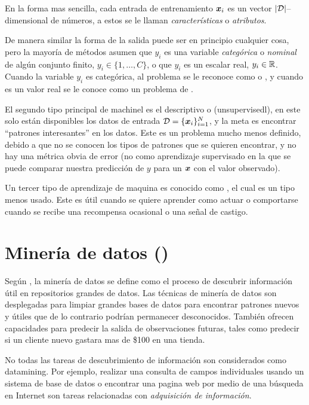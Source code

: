 En la forma mas sencilla, cada entrada de entrenamiento ${\bm{x}}_i$ es un vector $|\mathcal{D}|$--dimensional de números, a estos se le llaman \emph{características} o \emph{atributos}.

De manera similar la forma de la salida puede ser en principio cualquier cosa, pero la mayoría de métodos asumen que $y_i$ es una variable \emph{categórica} o \emph{nominal} de algún conjunto finito, $y_i \in \{1,\ldots,C\}$, o que $y_i$ es un escalar real, $y_i \in \mathbb{R}$. Cuando la variable $y_i$ es categórica, al problema se le reconoce como  o , y cuando es un valor real se le conoce como un problema de .

El segundo tipo principal de \gls{machinel} es el descriptivo o  (\gls{unsupervisedl}), en este solo están disponibles los datos de entrada $\mathcal{D} = \{{\bm{x}}_i\}_{i=1}^{N}$, y la meta es encontrar ``patrones interesantes'' en los datos. Este es un problema mucho menos definido, debido a que no se conocen los tipos de patrones que se quieren encontrar, y no hay una métrica obvia de error (no como aprendizaje supervisado en la que se puede comparar nuestra predicción de $y$ para un ${\bm{x}}$ con el valor observado).

Un tercer tipo de aprendizaje de maquina es conocido como , el cual es un tipo menos usado. Este es útil cuando se quiere aprender como actuar o comportarse cuando se recibe una recompensa ocasional o una señal de castigo.

\section{Minería de datos ()} \label{sec:datamining}
Según \cite{tan2005introduction}, la minería de datos se define como el proceso de descubrir información útil en repositorios grandes de datos. Las técnicas de minería de datos son desplegadas para limpiar grandes bases de datos para encontrar patrones nuevos y útiles que de lo contrario podrían permanecer desconocidos. También ofrecen capacidades para predecir la salida de observaciones futuras, tales como predecir si un cliente nuevo gastara mas de \$100 en una tienda.

No todas las tareas de descubrimiento de información son considerados como \gls{datamining}. Por ejemplo, realizar una consulta de campos individuales usando un sistema de base de datos o encontrar una pagina web por medio de una búsqueda en Internet son tareas relacionadas con \emph{adquisición de información}.

